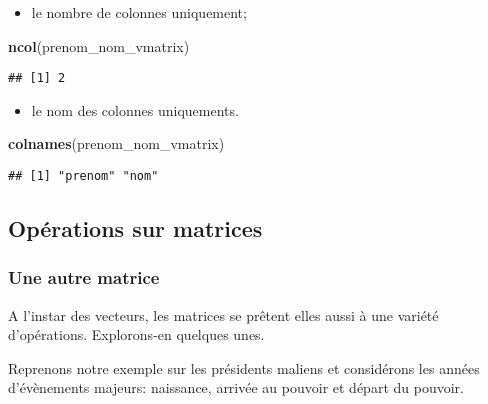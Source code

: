 \documentclass[]{book}
\newenvironment{Shaded}{\begin{snugshade}}{\end{snugshade}}
\newcommand{\KeywordTok}[1]{\textcolor[rgb]{0.13,0.29,0.53}{\textbf{#1}}}
\newcommand{\NormalTok}[1]{#1}
\providecommand{\tightlist}{%
  \setlength{\itemsep}{0pt}\setlength{\parskip}{0pt}}
\begin{document}
\begin{itemize}
\tightlist
\item
  le nombre de colonnes uniquement;
\end{itemize}

\begin{Shaded}
\begin{Highlighting}[]
\KeywordTok{ncol}\NormalTok{(prenom_nom_vmatrix)}
\end{Highlighting}
\end{Shaded}

\begin{verbatim}
## [1] 2
\end{verbatim}

\begin{itemize}
\tightlist
\item
  le nom des colonnes uniquements.
\end{itemize}

\begin{Shaded}
\begin{Highlighting}[]
\KeywordTok{colnames}\NormalTok{(prenom_nom_vmatrix)}
\end{Highlighting}
\end{Shaded}

\begin{verbatim}
## [1] "prenom" "nom"
\end{verbatim}

\subsection{Opérations sur matrices}\label{operations-sur-matrices}

\subsubsection{Une autre matrice}\label{une-autre-matrice}

A l'instar des vecteurs, les matrices se prêtent elles aussi à une
variété d'opérations. Explorons-en quelques unes.

Reprenons notre exemple sur les présidents maliens et considérons les
années d'évènements majeurs: naissance, arrivée au pouvoir et départ du
pouvoir.
\end{document}
